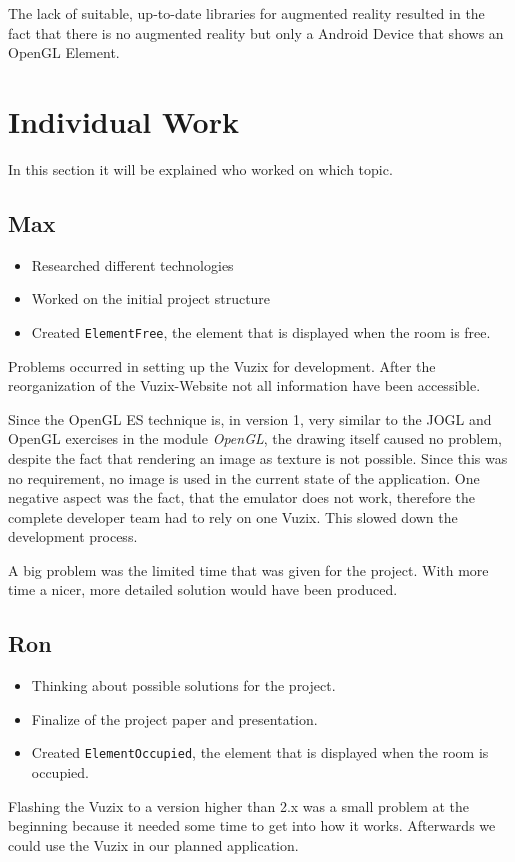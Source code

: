 \documentclass[11pt]{scrartcl}
\begin{document}
\begin{multicols}{2}
		The lack of suitable, up-to-date libraries for augmented reality resulted in the fact that there is no augmented reality but only a Android Device that shows an OpenGL Element.  

	\section{Individual Work}
		In this section it will be explained who worked on which topic.
		\subsection{Max}
			\begin{itemize}
				\item Researched different technologies
				\item Worked on the initial project structure
				\item Created \texttt{ElementFree}, the element that is displayed when the room is free.
			\end{itemize}
			 Problems occurred in setting up the Vuzix for development. After the reorganization of the Vuzix-Website not all information have been accessible.
			 
			 Since the OpenGL ES technique is, in version 1, very similar to the JOGL and OpenGL exercises in the module \emph{OpenGL}, the drawing itself caused no problem, despite the fact that rendering an image as texture is not possible. Since this was no requirement, no image is used in the current state of the application.  One negative aspect was the fact, that the emulator does not work, therefore the complete developer team had to rely on one Vuzix. This slowed down the development process.
			 
			 A big problem was the limited time that was given for the project.  With more time a nicer, more detailed solution would have been produced.
		\subsection{Ron}
			\begin{itemize}
				\item Thinking about possible solutions for the project.
				\item Finalize of the project paper and presentation.
				\item Created \texttt{ElementOccupied}, the element that is displayed when the room is occupied.
			\end{itemize}
			Flashing the Vuzix to a version higher than 2.x was a small problem at the beginning because it needed some time to get into how it works. Afterwards we could use the Vuzix in our planned application.
			

\end{multicols}
\end{document}
